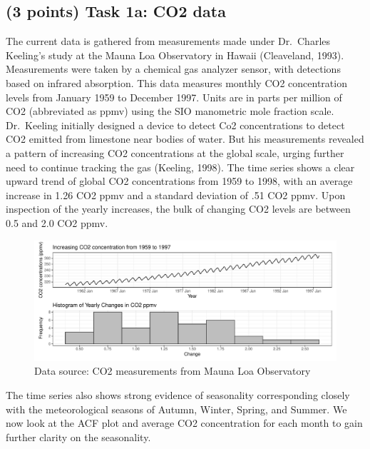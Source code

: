 \documentclass[
]{article}
\begin{document}
\subsection{(3 points) Task 1a: CO2 data}\label{points-task-1a-co2-data}

The current data is gathered from measurements made under Dr.~Charles Keeling's study at the Mauna Loa Observatory in Hawaii (Cleaveland, 1993). Measurements were taken by a chemical gas analyzer sensor, with detections based on infrared absorption. This data measures monthly CO2 concentration levels from January 1959 to December 1997. Units are in parts per million of CO2 (abbreviated as ppmv) using the SIO manometric mole fraction scale. Dr.~Keeling initially designed a device to detect Co2 concentrations to detect CO2 emitted from limestone near bodies of water. But his measurements revealed a pattern of increasing CO2 concentrations at the global scale, urging further need to continue tracking the gas (Keeling, 1998). The time series shows a clear upward trend of global CO2 concentrations from 1959 to 1998, with an average increase in 1.26 CO2 ppmv and a standard deviation of .51 CO2 ppmv. Upon inspection of the yearly increases, the bulk of changing CO2 levels are between 0.5 and 2.0 CO2 ppmv.

\begin{figure}

{\centering \includegraphics[width=1\linewidth]{lab_prompt_Updated_files/figure-latex/time-series-and-hist-1} 

}

\caption{Data source: CO2 measurements from Mauna Loa Observatory}\label{fig:time-series-and-hist}
\end{figure}

The time series also shows strong evidence of seasonality corresponding closely with the meteorological seasons of Autumn, Winter, Spring, and Summer. We now look at the ACF plot and average CO2 concentration for each month to gain further clarity on the seasonality.
\end{document}
